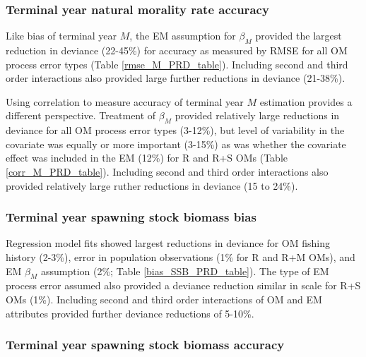 \documentclass[
  12pt,
]{article}
\begin{document}
\subsubsection*{Terminal year natural morality rate
accuracy}\label{terminal-year-natural-morality-rate-accuracy}

Like bias of terminal year \(M\), the EM assumption for \(\beta_M\)
provided the largest reduction in deviance (22-45\%) for accuracy as
measured by RMSE for all OM process error types (Table
\ref{rmse_M_PRD_table}). Including second and third order interactions
also provided large further reductions in deviance (21-38\%).

Using correlation to measure accuracy of terminal year \(M\) estimation
provides a different perspective. Treatment of \(\beta_M\) provided
relatively large reductions in deviance for all OM process error types
(3-12\%), but level of variability in the covariate was equally or more
important (3-15\%) as was whether the covariate effect was included in
the EM (12\%) for R and R+S OMs (Table \ref{corr_M_PRD_table}).
Including second and third order interactions also provided relatively
large ruther reductions in deviance (15 to 24\%).

\subsubsection*{Terminal year spawning stock biomass
bias}\label{terminal-year-spawning-stock-biomass-bias}

Regression model fits showed largest reductions in deviance for OM
fishing history (2-3\%), error in population observations (1\% for R and
R+M OMs), and EM \(\beta_M\) assumption (2\%; Table
\ref{bias_SSB_PRD_table}). The type of EM process error assumed also
provided a deviance reduction similar in scale for R+S OMs (1\%).
Including second and third order interactions of OM and EM attributes
provided further deviance reductions of 5-10\%.

\subsubsection*{Terminal year spawning stock biomass
accuracy}\label{terminal-year-spawning-stock-biomass-accuracy}
\end{document}
